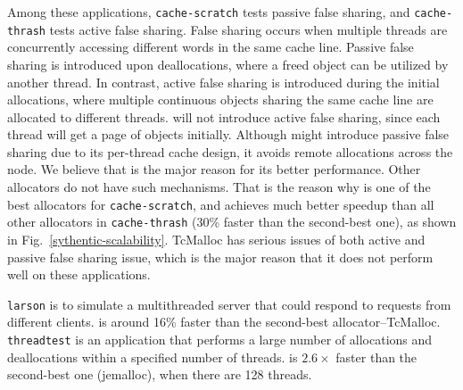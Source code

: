 Among these applications, \texttt{cache-scratch} tests passive false sharing, and \texttt{cache-thrash} tests active false sharing. False sharing occurs when multiple threads are concurrently accessing different words in the same cache line. 
Passive false sharing is introduced upon deallocations, where a freed object can be utilized by another thread. In contrast, active false sharing is introduced during the initial allocations, where multiple continuous objects sharing the same cache line are allocated to different threads. 
 \NM{} will not introduce active false sharing, since each thread will get a page of objects initially. Although \NM{} might introduce passive false sharing due to its per-thread cache design, it avoids remote allocations across the node. 
 We believe that is the major reason for its better performance. Other allocators do not have such mechanisms. 
 That is the reason why \NM{} is one of the best allocators for \texttt{cache-scratch}, and achieves much better speedup than all other allocators in \texttt{cache-thrash} (30\% faster than the second-best one), as shown in Fig.~\ref{sythentic-scalability}. TcMalloc has serious issues of both active and passive false sharing issue, which is the major reason that it does not perform well on these applications.  
 
 \texttt{larson} is to simulate a multithreaded server that could respond to requests from different clients. \NM{} is around 16\% faster than the second-best allocator--TcMalloc.  
 \texttt{threadtest} is an application that performs a large number of allocations and deallocations within a specified number of threads. \NM{} is $2.6\times$ faster than the second-best one (jemalloc), when there are 128 threads.





